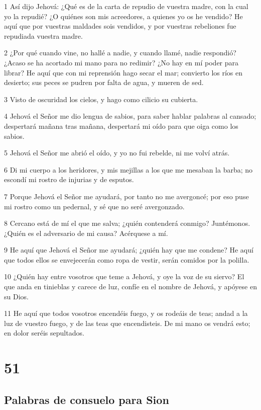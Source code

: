 \par 1 Así dijo Jehová: ¿Qué es de la carta de repudio de vuestra madre, con la cual yo la repudié? ¿O quiénes son mis acreedores, a quienes yo os he vendido? He aquí que por vuestras maldades sois vendidos, y por vuestras rebeliones fue repudiada vuestra madre.
\par 2 ¿Por qué cuando vine, no hallé a nadie, y cuando llamé, nadie respondió? ¿Acaso se ha acortado mi mano para no redimir? ¿No hay en mí poder para librar? He aquí que con mi reprensión hago secar el mar; convierto los ríos en desierto; sus peces se pudren por falta de agua, y mueren de sed. 
\par 3 Visto de oscuridad los cielos, y hago como cilicio su cubierta.
\par 4 Jehová el Señor me dio lengua de sabios, para saber hablar palabras al cansado; despertará mañana tras mañana, despertará mi oído para que oiga como los sabios.
\par 5 Jehová el Señor me abrió el oído, y yo no fui rebelde, ni me volví atrás.
\par 6 Di mi cuerpo a los heridores, y mis mejillas a los que me mesaban la barba; no escondí mi rostro de injurias y de esputos. 
\par 7 Porque Jehová el Señor me ayudará, por tanto no me avergoncé; por eso puse mi rostro como un pedernal, y sé que no seré avergonzado.
\par 8 Cercano está de mí el que me salva; ¿quién contenderá conmigo? Juntémonos. ¿Quién es el adversario de mi causa? Acérquese a mí.
\par 9 He aquí que Jehová el Señor me ayudará; ¿quién hay que me condene? He aquí que todos ellos se envejecerán como ropa de vestir, serán comidos por la polilla.
\par 10 ¿Quién hay entre vosotros que teme a Jehová, y oye la voz de su siervo? El que anda en tinieblas y carece de luz, confíe en el nombre de Jehová, y apóyese en su Dios.
\par 11 He aquí que todos vosotros encendéis fuego, y os rodeáis de teas; andad a la luz de vuestro fuego, y de las teas que encendisteis. De mi mano os vendrá esto; en dolor seréis sepultados.

\chapter{51}

\section*{Palabras de consuelo para Sion}

